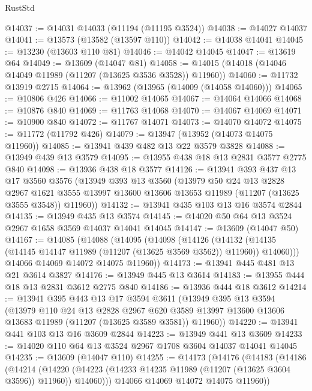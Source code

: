 \begin{lexlean}{RustStd}
\begin{coremodule}
@14037 := @14031 @14033 (@11194 (@11195 @3524))
@14038 := @14027 @14037
@14041 := @13573 (@13582 (@13597 @110))
@14042 := @14038 @14041
@14045 := @13230 (@13603 @110 @81)
@14046 := @14042 @14045
@14047 := @13619 @64
@14049 := @13609 (@14047 @81)
@14058 := @14015 (@14018 (@14046 @14049 @11989 (@11207 (@13625 @3536 @3528)) @11960))
@14060 := @11732 @13919 @2715
@14064 := @13962 (@13965 (@14009 (@14058 @14060)))
@14065 := @10806 @426
@14066 := @11002 @14065
@14067 := @14064 @14066
@14068 := @10876 @840
@14069 := @11763 @14068
@14070 := @14067 @14069
@14071 := @10900 @840
@14072 := @11767 @14071
@14073 := @14070 @14072
@14075 := @11772 (@11792 @426)
@14079 := @13947 (@13952 (@14073 @14075 @11960))
@14085 := @13941 @439 @482 @13 @22 @3579 @3828
@14088 := @13949 @439 @13 @3579
@14095 := @13955 @438 @18 @13 @2831 @3577 @2775 @840
@14098 := @13936 @438 @18 @3577
@14126 := @13941
    @393
    @437
    @13
    @17
    @3560
    @3576
    (@13949
      @393
      @13
      @3560
      (@13979
        @50
        @24
        @13
        @2828
        @2967
        @1621
        @3555
        @13997
        @13600
        @13606
        @13653
        @11989
        (@11207 (@13625 @3555 @3548))
        @11960))
@14132 := @13941 @435 @103 @13 @16 @3574 @2844
@14135 := @13949 @435 @13 @3574
@14145 := @14020 @50 @64 @13 @3524 @2967 @1658 @3569 @14037 @14041 @14045
@14147 := @13609 (@14047 @50)
@14167 := @14085
    (@14088
      (@14095
        (@14098
          (@14126
            (@14132 (@14135 (@14145 @14147 @11989 (@11207 (@13625 @3569 @3562)) @11960)) @14060)))
        @14066
        @14069
        @14072
        @14075
        @11960))
@14173 := @13941 @445 @481 @13 @21 @3614 @3827
@14176 := @13949 @445 @13 @3614
@14183 := @13955 @444 @18 @13 @2831 @3612 @2775 @840
@14186 := @13936 @444 @18 @3612
@14214 := @13941
    @395
    @443
    @13
    @17
    @3594
    @3611
    (@13949
      @395
      @13
      @3594
      (@13979
        @110
        @24
        @13
        @2828
        @2967
        @620
        @3589
        @13997
        @13600
        @13606
        @13683
        @11989
        (@11207 (@13625 @3589 @3581))
        @11960))
@14220 := @13941 @441 @103 @13 @16 @3609 @2844
@14223 := @13949 @441 @13 @3609
@14233 := @14020 @110 @64 @13 @3524 @2967 @1708 @3604 @14037 @14041 @14045
@14235 := @13609 (@14047 @110)
@14255 := @14173
    (@14176
      (@14183
        (@14186
          (@14214
            (@14220 (@14223 (@14233 @14235 @11989 (@11207 (@13625 @3604 @3596)) @11960)) @14060)))
        @14066
        @14069
        @14072
        @14075
        @11960))

\end{coremodule}
\end{lexlean}
